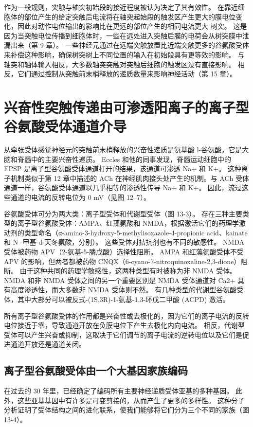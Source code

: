 作为一般规则，突触与轴突初始段的接近程度被认为决定了其有效性。 在靠近细胞体的部位产生的给定突触后电流将在轴突起始段的触发区产生更大的膜电位变化，因此对动作电位输出的影响比在更远的部位产生的相同电流更大 树突。 这是因为当突触电位传播到细胞体时，一些在远处进入突触后膜的电荷会从树突膜中泄漏出来（第 9 章）。 一些神经元通过在远端突触放置比近端突触更多的谷氨酸受体来补偿这种影响，确保树突树上不同位置的输入在初始段具有更等效的影响。 与轴突和轴体输入相反，大多数轴突突触对突触后细胞的触发区没有直接影响。 相反，它们通过控制从突触前末梢释放的递质数量来影响神经活动（第 15 章）。



\section{兴奋性突触传递由可渗透阳离子的离子型谷氨酸受体通道介导}
从牵张受体感觉神经元的突触前末梢释放的兴奋性递质是氨基酸 l-谷氨酸，它是大脑和脊髓中的主要兴奋性递质。 Eccles 和他的同事发现，脊髓运动细胞中的 EPSP 是离子型谷氨酸受体通道打开的结果，该通道可渗透 Na+ 和 K+。 这种离子机制类似于第 12 章中描述的 ACh 在神经肌肉接头处产生的机制。与 ACh 受体通道一样，谷氨酸受体通道以几乎相等的渗透性传导 Na+ 和 K+。 因此，流过这些通道的电流的反转电位为 0 mV（见图 12–7）。

谷氨酸受体可分为两大类：离子型受体和代谢型受体（图 13-3）。 存在三种主要类型的离子型谷氨酸受体：AMPA、红藻氨酸和 NMDA，根据激活它们的药理学激动剂的类型命名（α-amino-3-hydroxy-5-methylisoxazole-4-propionic acid、kainate 和 N -甲基-d-天冬氨酸，分别）。 这些受体对拮抗剂也有不同的敏感性。 NMDA 受体被药物 APV（2-氨基-5-膦戊酸）选择性阻断。 AMPA 和红藻氨酸受体不受 APV 的影响，但两者都被药物 CNQX（6-cyano-7-nitroquinoxaline-2,3-dione）阻断。 由于这种共同的药理学敏感性，这两种类型有时被称为非 NMDA 受体。 NMDA 和非 NMDA 受体之间的另一个重要区别是 NMDA 受体通道对 Ca2+ 具有高度渗透性，而大多数非 NMDA 受体则不然。 有几种类型的代谢型谷氨酸受体，其中大部分可以被反式-(1S,3R)-1-氨基-1,3-环戊二甲酸 (ACPD) 激活。

所有离子型谷氨酸受体的作用都是兴奋性或去极化的，因为它们的离子电流的反转电位接近于零，导致通道开放在负膜电位下产生去极化内向电流。 相反，代谢型受体可以产生兴奋或抑制，这取决于它们调节的离子电流的逆转电位以及它们是促进通道开放还是通道关闭。

\subsection{离子型谷氨酸受体由一个大基因家族编码}
在过去的 30 年里，已经确定了编码所有主要神经递质受体亚基的多种基因。 此外，这些亚基基因中有许多是可变剪接的，从而产生了更多的多样性。 这种分子分析证明了受体结构之间的进化联系，使我们能够将它们分为三个不同的家族（图 13-4）。

